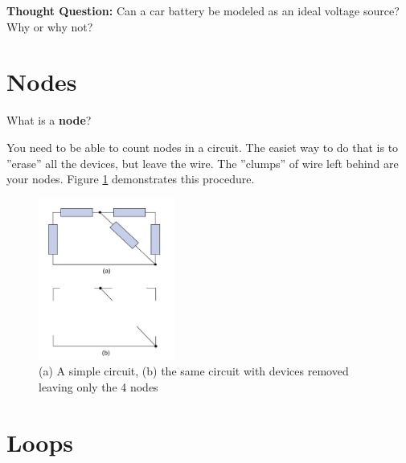 \documentclass{handout}
\begin{document}
\textbf{Thought Question:} Can a car battery be modeled as an ideal voltage source? Why or why not?


\newpage

\section{Nodes}

What is a \textbf{node}?


You need to be able to count nodes in a circuit.  The easiet way to do that is to ''erase'' all the devices, but leave the wire.  The ''clumps'' of wire left behind are your nodes. Figure \ref{fig: CountingNodes} demonstrates this procedure.

\begin{figure}[h b t]
\centering
\includegraphics[width=0.4\textwidth]{CountingNodes.jpg}
\caption{(a) A simple circuit,  (b) the same circuit with devices removed leaving only the 4 nodes}
\label{fig: CountingNodes}
\end{figure}

\newpage

\section{Loops}
\end{document}
